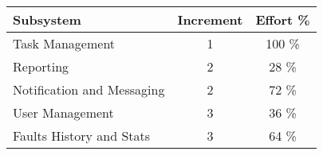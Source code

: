 
\begin{tabular}{l|c|c}
\textbf{Subsystem} & \textbf{Increment} & \textbf{Effort \%}  \\ \hline
Task Management & 1 & 100 \% \\
Reporting & 2 & 28 \% \\
Notification and Messaging & 2 & 72 \% \\
User Management & 3 & 36 \% \\
Faults History and Stats & 3 & 64 \% \\
\end{tabular}
